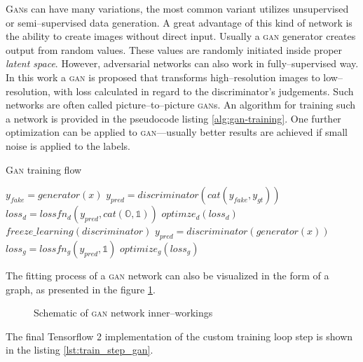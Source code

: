 \textsc{Gan}s can have many variations, the most common variant utilizes unsupervised or semi--supervised data generation.
A great advantage of this kind of network is the ability to create images without direct input.
Usually a \textsc{gan} generator creates output from random values.
These values are randomly initiated inside proper \textit{latent space}.
However, adversarial networks can also work in fully--supervised way.
In this work a \textsc{gan} is proposed that transforms high--resolution images to low--resolution, with loss calculated in regard to the discriminator's judgements.
Such networks are often called picture--to--picture \textsc{gan}s.
An algorithm for training such a network is provided in the pseudocode listing \ref{alg:gan-training}.
One further optimization can be applied to \textsc{gan}---usually better results are achieved if small noise is applied to the labels.
\begin{algorithm}
\caption{\textsc{Gan} training flow}
\label{alg:gan-training}
\begin{algorithmic}
	\STATE $ y_{fake} = generator(x) $
	\STATE $ y_{pred} = discriminator(cat(y_{fake}, y_{gt})) $
	\STATE $ loss_d = lossfn_d(y_{pred}, cat(\mathds{O}, \mathds{1})) $
	\STATE $ optimze_d(loss_d) $
	\STATE $ freeze\_learning(discriminator) $
	\STATE $ y_{pred} = discriminator(generator(x)) $
	\STATE $ loss_g = lossfn_g(y_{pred}, \mathds{1}) $
	\STATE $ optimize_g(loss_g) $
\end{algorithmic}
\end{algorithm}
The fitting process of a \textsc{gan} network can also be visualized in the form of a graph, as presented in the figure \ref{fig:gan-training}.
\begin{figure}
    \centering
    
    \caption{Schematic of \textsc{gan} network inner--workings}
    \label{fig:gan-training}
\end{figure}
The final Tensorflow 2 implementation of the custom training loop step is shown in the listing \ref{lst:train_step_gan}.
